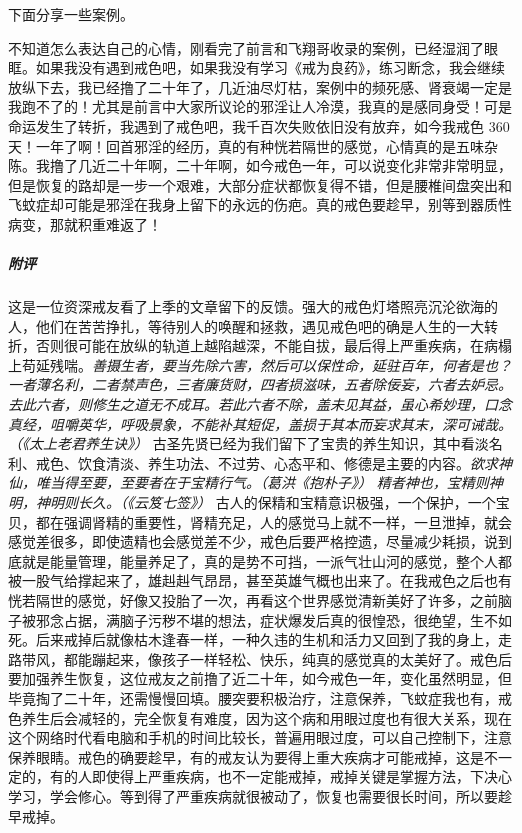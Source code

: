 下面分享一些案例。

\begin{case}
    不知道怎么表达自己的心情，刚看完了前言和飞翔哥收录的案例，已经湿润了眼眶。如果我没有遇到戒色吧，如果我没有学习《戒为良药》，练习断念，我会继续放纵下去，我已经撸了二十年了，几近油尽灯枯，案例中的频死感、肾衰竭一定是我跑不了的！尤其是前言中大家所议论的邪淫让人冷漠，我真的是感同身受！可是命运发生了转折，我遇到了戒色吧，我千百次失败依旧没有放弃，如今我戒色 360 天！一年了啊！回首邪淫的经历，真的有种恍若隔世的感觉，心情真的是五味杂陈。我撸了几近二十年啊，二十年啊，如今戒色一年，可以说变化非常非常明显，但是恢复的路却是一步一个艰难，大部分症状都恢复得不错，但是腰椎间盘突出和飞蚊症却可能是邪淫在我身上留下的永远的伤疤。真的戒色要趁早，别等到器质性病变，那就积重难返了！
    \subparagraph{附评} 这是一位资深戒友看了上季的文章留下的反馈。强大的戒色灯塔照亮沉沦欲海的人，他们在苦苦挣扎，等待别人的唤醒和拯救，遇见戒色吧的确是人生的一大转折，否则很可能在放纵的轨道上越陷越深，不能自拔，最后得上严重疾病，在病榻上苟延残喘。\textit{善摄生者，要当先除六害，然后可以保性命，延驻百年，何者是也？一者薄名利，二者禁声色，三者廉货财，四者损滋味，五者除佞妄，六者去妒忌。去此六者，则修生之道无不成耳。若此六者不除，盖未见其益，虽心希妙理，口念真经，咀嚼英华，呼吸景象，不能补其短促，盖损于其本而妄求其末，深可诫哉。（《太上老君养生诀》）} 古圣先贤已经为我们留下了宝贵的养生知识，其中看淡名利、戒色、饮食清淡、养生功法、不过劳、心态平和、修德是主要的内容。\textit{欲求神仙，唯当得至要，至要者在于宝精行气。（葛洪《抱朴子》）} \textit{精者神也，宝精则神明，神明则长久。（《云笈七签》）} 古人的保精和宝精意识极强，一个保护，一个宝贝，都在强调肾精的重要性，肾精充足，人的感觉马上就不一样，一旦泄掉，就会感觉差很多，即使遗精也会感觉差不少，戒色后要严格控遗，尽量减少耗损，说到底就是能量管理，能量养足了，真的是势不可挡，一派气壮山河的感觉，整个人都被一股气给撑起来了，雄赳赳气昂昂，甚至英雄气概也出来了。在我戒色之后也有恍若隔世的感觉，好像又投胎了一次，再看这个世界感觉清新美好了许多，之前脑子被邪念占据，满脑子污秽不堪的想法，症状爆发后真的很惶恐，很绝望，生不如死。后来戒掉后就像枯木逢春一样，一种久违的生机和活力又回到了我的身上，走路带风，都能蹦起来，像孩子一样轻松、快乐，纯真的感觉真的太美好了。戒色后要加强养生恢复，这位戒友之前撸了近二十年，如今戒色一年，变化虽然明显，但毕竟掏了二十年，还需慢慢回填。腰突要积极治疗，注意保养，飞蚊症我也有，戒色养生后会减轻的，完全恢复有难度，因为这个病和用眼过度也有很大关系，现在这个网络时代看电脑和手机的时间比较长，普遍用眼过度，可以自己控制下，注意保养眼睛。戒色的确要趁早，有的戒友认为要得上重大疾病才可能戒掉，这是不一定的，有的人即使得上严重疾病，也不一定能戒掉，戒掉关键是掌握方法，下决心学习，学会修心。等到得了严重疾病就很被动了，恢复也需要很长时间，所以要趁早戒掉。
\end{case}

